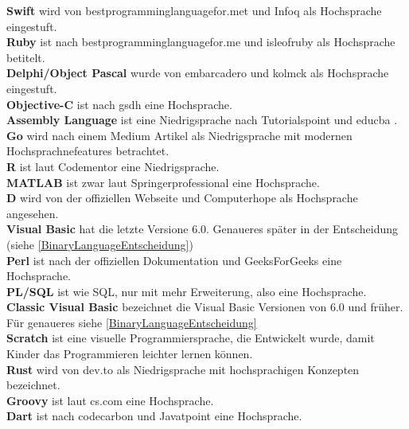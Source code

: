 \documentclass[ngerman]{article}
\begin{document}
    \textbf{Swift} wird von bestprogramminglanguagefor.met \cite{SwiftLevel1} und Infoq \cite{SwiftLevel2} als Hochsprache eingestuft.\\
    \textbf{Ruby} ist nach bestprogramminglanguagefor.me \cite{RubyLevel1} und isleofruby \cite{RubyLevel2} als Hochsprache betitelt.\\
    \textbf{Delphi/Object Pascal} wurde von embarcadero \cite{DelphiLevel1} und kolmck \cite{DelphiLevel2} als Hochsprache eingestuft.\\
    \textbf{Objective-C} ist nach gsdh \cite{ObjCLevel} eine Hochsprache.\\
    \textbf{Assembly Language} ist eine Niedrigsprache nach Tutorialspoint \cite{AssLanLevel1} und educba \cite{AssLanLevel2}.\\
    \textbf{Go} wird nach einem Medium Artikel \cite{GoLevel} als Niedrigsprache mit modernen Hochsprachnefeatures betrachtet.\\
    \textbf{R} ist laut Codementor \cite{RLevel} eine Niedrigsprache.\\
    \textbf{MATLAB} ist zwar laut Springerprofessional \cite{MATLABLevel} eine Hochsprache.\\
    \textbf{D} wird von der offiziellen Webseite \cite{DLevel1} und Computerhope \cite{DLevel2} als Hochsprache angesehen.\\
    \textbf{Visual Basic} hat die letzte Versione 6.0. Genaueres später in der Entscheidung (siehe \ref{BinaryLanguageEntscheidung})\\
    \textbf{Perl} ist nach der offiziellen Dokumentation \cite{PerlLevel1} und GeeksForGeeks \cite{PerlLevel2} eine Hochsprache.\\
    \textbf{PL/SQL} ist wie SQL, nur mit mehr Erweiterung, also eine Hochsprache.\\
    \textbf{Classic Visual Basic} bezeichnet die Visual Basic Versionen von 6.0 und früher. Für genaueres siehe \ref{BinaryLanguageEntscheidung}\\
    \textbf{Scratch} ist eine visuelle Programmiersprache, die Entwickelt wurde, damit Kinder das Programmieren leichter lernen können.\\
    \textbf{Rust} wird von dev.to \cite{RustLevel} als Niedrigsprache mit hochsprachigen Konzepten bezeichnet.\\
    \textbf{Groovy} ist laut cs.com \cite{GroovyLevel} eine Hochsprache.\\
    \textbf{Dart} ist nach codecarbon \cite{DartLevel1} und Javatpoint \cite{DartLevel2} eine Hochsprache.\\
\end{document}
